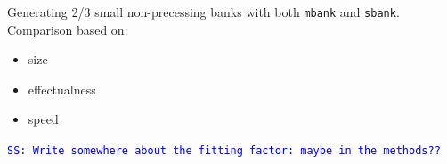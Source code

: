\documentclass[twocolumn,showpacs,preprintnumbers,nofootinbib,prd,
superscriptaddress,10pt]{revtex4-1}
\newcommand{\stefano}[1]{{\textcolor{blue}{\texttt{SS: #1}} }}
\begin{document}

Generating 2/3 small non-precessing banks with both \texttt{mbank} and \texttt{sbank}.
Comparison based on:
	\begin{itemize}
		\item size
		\item effectualness
		\item speed
	\end{itemize}

\stefano{Write somewhere about the fitting factor: maybe in the methods??}
\end{document}
